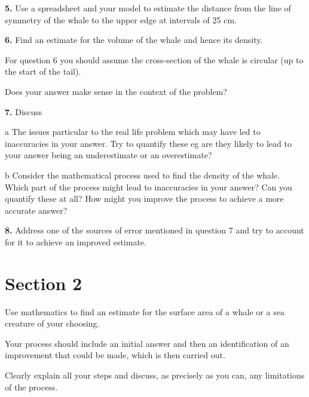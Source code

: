 \documentclass[fleqn]{article}
\begin{document}
\textbf{5.}	Use a spreadsheet and your model to estimate the distance from the line of symmetry of the whale to the upper edge at intervals of 25 cm.

\textbf{6.}	Find an estimate for the volume of the whale and hence its density.
{\color{red}{Must include a justification for the precision of the answer}}

For question 6 you should assume the cross-section of the whale is circular (up to the start of the tail).

	Does your answer make sense in the context of the problem?

\textbf{7.}	Discuss 

a	The issues particular to the real life problem which may have led to inaccuracies in your answer.  Try to quantify these eg are they likely to lead to your answer being an underestimate or an overestimate?

b	Consider the mathematical process used to find the density of the whale.  Which part of the process might lead to inaccuracies in your answer?  Can you quantify these at all?  How might you improve the process to achieve a more accurate answer?

\textbf{8.}	Address one of the sources of error mentioned in question 7 and  try to account for it to achieve an improved estimate.


\section{Section 2}

Use mathematics to find an estimate for the surface area of a whale or a sea creature of your choosing. 

Your process should include an initial answer and then an identification of an improvement that could be made, which is then carried out.

Clearly explain all your steps  and discuss, as precisely as you can, any limitations of the process.  
\end{document}

